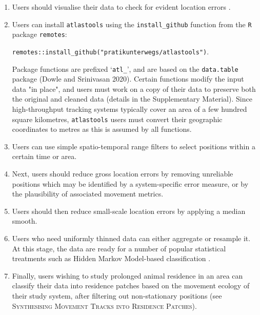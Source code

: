 \documentclass[10pt,paper=a4,headings=standardclasses
]{scrartcl}
\begin{document}
\begin{enumerate}
    
    \item Users should visualise their data to check for evident location errors \citep{slingsby2016}.
    \item Users can install \texttt{atlastools} using the \texttt{install\_github} function from the \texttt{R} package \texttt{remotes}:
    
    \texttt{remotes::install\_github("pratikunterwegs/atlastools")}.
    
    Package functions are prefixed `\texttt{atl\_}', and are based on the \texttt{data.table} package (Dowle and Srinivasan 2020).
    Certain functions modify the input data "in place", and users must work on a copy of their data to preserve both the original and cleaned data (details in the Supplementary Material).
    Since high-throughput tracking systems typically cover an area of a few hundred square kilometres, \texttt{atlastools} users must convert their geographic coordinates to metres as this is assumed by all functions.
    \item Users can use simple spatio-temporal range filters to select positions within a certain time or area.
    \item Next, users should reduce gross location errors by removing unreliable positions which may be identified by a system-specific error measure, or by the plausibility of associated movement metrics.
    \item Users should then reduce small-scale location errors by applying a median smooth.
    \item Users who need uniformly thinned data can either aggregate or resample it.
    At this stage, the data are ready for a number of popular statistical treatments such as Hidden Markov Model-based classification \citep{michelot2016,langrock2012}.
    \item Finally, users wishing to study prolonged animal residence in an area can classify their data into residence patches based on the movement ecology of their study system, after filtering out non-stationary positions (see \textsc{Synthesising Movement Tracks into Residence Patches}).
    
\end{enumerate}
\end{document}
